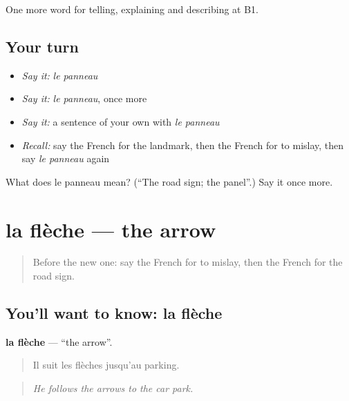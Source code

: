 \begin{grammarlens}[title={What you've built}]
One more word for telling, explaining and describing at B1.
\end{grammarlens}

\subsection*{Your turn}
\begin{itemize}
\raggedright
  \item \emph{Say it:} \emph{le panneau}
  \item \emph{Say it:} \emph{le panneau}, once more
  \item \emph{Say it:} a sentence of your own with \emph{le panneau}
  \item \emph{Recall:} say the French for the landmark, then the French for to mislay, then say \emph{le panneau} again
\end{itemize}

\begin{tcolorbox}[breakable,colback=teal!4,colframe=teal!35!black,title={Before you move on}]
What does le panneau mean? (\textquotedblleft{}The road sign; the panel\textquotedblright{}.) Say it once more.
\end{tcolorbox}
\section[la flèche]{la flèche — the arrow}

\label{lesson:FR-C435-fleche}



\begin{quote}
Before the new one: say the French for to mislay, then the French for the road sign.
\end{quote}

\subsection*{You'll want to know: la flèche}
\textbf{la flèche} — \textquotedblleft{}the arrow\textquotedblright{}.

\begin{quote}
Il suit les flèches jusqu'au parking.
\end{quote}

\begin{quote}
\emph{He follows the arrows to the car park.}
\end{quote}

